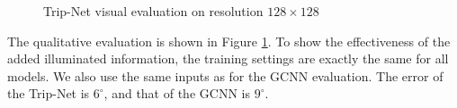 \begin{figure}[H]
	\decoRule
	\caption{Trip-Net visual evaluation on resolution $ 128\times128 $}
	\label{fig:trip-eval}
\end{figure}
The qualitative evaluation is shown in Figure \ref{fig:trip-eval}. To show the effectiveness of the added illuminated information, the training settings are exactly the same for all models. We also use the same inputs as for the GCNN evaluation. The error of the Trip-Net is $ 6^\circ $, and that of the GCNN is $ 9^\circ $. 

